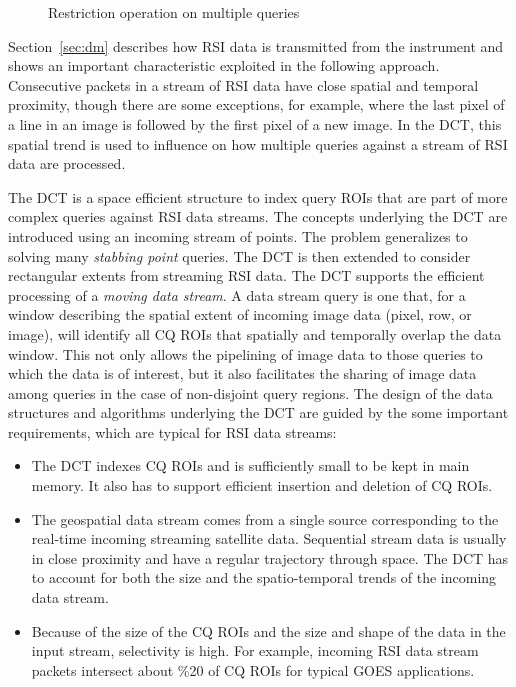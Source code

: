 \documentclass{ucdthesis}       %
\begin{document}
\begin{figure}[htb]
  \centering
  \scalebox{1.5}{  }
  \caption{Restriction operation on multiple queries} 
\label{fig:query-eval2}
\end{figure}

Section~\ref{sec:dm} describes how \ac{RSI} data is transmitted from
the instrument and shows an important characteristic exploited in the
following approach.  Consecutive packets in a stream of \ac{RSI} data
have close spatial and temporal proximity, though there are some
exceptions, for example, where the last pixel of a line in an image is
followed by the first pixel of a new image.  In the \ac{DCT}, this
spatial trend is used to influence on how multiple queries against a
stream of \ac{RSI} data are processed.

The \acf{DCT} is a space efficient structure to index query \acp{ROI}
that are part of more complex queries against \acs{RSI} data streams.
The concepts underlying the \acs{DCT} are introduced using an incoming
stream of points.  The problem generalizes to solving many
\emph{stabbing point} queries.  The \ac{DCT} is then extended to consider
rectangular extents from streaming \ac{RSI} data.  The \acs{DCT}
supports the efficient processing of a \emph{moving data stream}.  A
data stream query is one that, for a window describing the spatial
extent of incoming image data (pixel, row, or image), will identify
all \ac{CQ} \acp{ROI} that spatially and temporally overlap the data
window. This not only allows the pipelining of image data to those
queries to which the data is of interest, but it also facilitates the
sharing of image data among queries in the case of non-disjoint query
regions. The design of the data structures and algorithms underlying
the \acs{DCT} are guided by the some important requirements, which are
typical for \acs{RSI} data streams:

\begin{itemize}
\item The \acs{DCT} indexes \ac{CQ} \acp{ROI} and is
  sufficiently small to be kept in main memory. It also has to support
  efficient insertion and deletion of \ac{CQ} \acp{ROI}.
  
\item The geospatial data stream comes from a single source
  corresponding to the real-time incoming streaming satellite data.
  Sequential stream data is usually in close proximity and have a
  regular trajectory through space. The \acs{DCT} has to account for
  both the size and the spatio-temporal trends of the incoming data
  stream.
  
\item Because of the size of the \ac{CQ} \acp{ROI} and the
  size and shape of the data in the input stream, selectivity is high.
  For example, incoming \ac{RSI} data stream packets intersect about
  \%20 of \ac{CQ} \acp{ROI} for typical \acs{GOES} applications.
\end{itemize}
\end{document}
